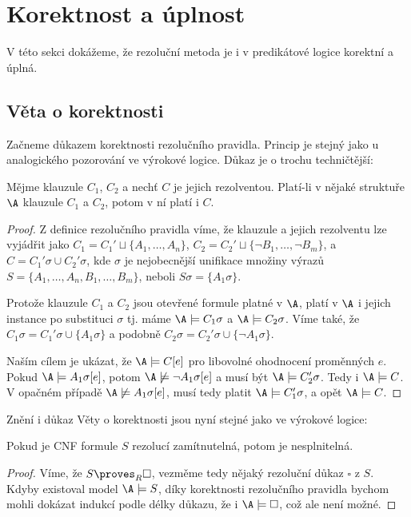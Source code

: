 
\section{Korektnost a úplnost}\label{section:predicate-resolution-soundness-completeness}

V této sekci dokážeme, že rezoluční metoda je i v predikátové logice korektní a úplná.

\subsection{Věta o korektnosti}

Začneme důkazem korektnosti rezolučního pravidla. Princip je stejný jako u analogického pozorování ve výrokové logice. Důkaz je o trochu techničtější:

\begin{proposition}
Mějme klauzule $C_1$, $C_2$ a nechť $C$ je jejich rezolventou. Platí-li v nějaké struktuře $\A$ klauzule $C_1$ a $C_2$, potom v ní platí i $C$.
\end{proposition}
\begin{proof}
Z definice rezolučního pravidla víme, že klauzule a jejich rezolventu lze vyjádřit jako $C_1=C_1'\sqcup \{A_1,\dots,A_n\}$, $C_2=C_2'\sqcup \{\neg B_1,\dots,\neg B_m\}$, a $C=C_1'\sigma \cup C_2'\sigma$, kde $\sigma$ je
nejobecnější unifikace množiny výrazů $S=\{A_1,\dots,A_n,B_1,\dots,B_m\}$, neboli $S\sigma=\{A_1\sigma\}$.

Protože klauzule $C_1$ a $C_2$ jsou otevřené formule platné v $\A$, platí v $\A$ i jejich instance po substituci $\sigma$ tj. máme $\A\models C_1\sigma$ a $\A\models C_2\sigma$. Víme také, že $C_1\sigma=C_1'\sigma \cup \{A_1\sigma\}$ a podobně $C_2\sigma=C_2'\sigma \cup \{\neg A_1\sigma\}$.

Naším cílem je ukázat, že $\A\models C[e]$ pro libovolné ohodnocení proměnných $e$. Pokud $\A\models A_1\sigma[e]$, potom $\A\not\models\neg A_1\sigma[e]$ a musí být $\A\models C_2'\sigma$. Tedy i $\A\models C$. V opačném případě $\A\not\models A_1\sigma[e]$, musí tedy platit $\A\models C_1'\sigma$, a opět $\A\models C$.
\end{proof}

Znění i důkaz Věty o korektnosti jsou nyní stejné jako ve výrokové logice:

\begin{theorem}\label{theorem:soundness-of-predicate-resolution}
    Pokud je CNF formule $S$ rezolucí zamítnutelná, potom je nesplnitelná.
\end{theorem}
\begin{proof}
    Víme, že $S\proves_R\square$, vezměme tedy nějaký rezoluční důkaz $\square$ z $S$. Kdyby existoval model $\A\models S$, díky korektnosti rezolučního pravidla bychom mohli dokázat indukcí podle délky důkazu, že i $\A\models\square$, což ale není možné.
\end{proof}


